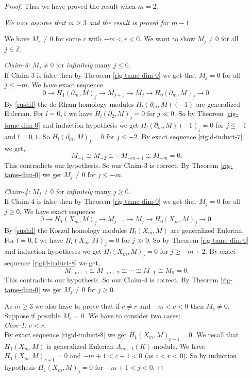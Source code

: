 \documentclass{amsart}
\newcommand{\ZZ}{\mathbb{Z} }
\newcommand{\rt}{\rightarrow}
\theoremstyle{plain}
\theoremstyle{definition}
\theoremstyle{remark}
\begin{document}
\begin{proof}
Thus we have proved the result when $m = 2$.

\textit{We now assume that $m \geq 3$ and the result is proved for $m-1$}.

We have $M_r \neq 0$ for some $r$ with $-m < r < 0$. We want to show $M_j \neq 0$ for all $j \in \ZZ$.

 \textit{Claim-3:} $M_j \neq 0$ for \textit{infinitely} many $j \leq 0$.\\
  If Claim-3 is false then by Theorem \ref{rig-tame-dim-0}  we get that $M_j  = 0$ for all $j \leq -m$.
  We have exact sequence
  \begin{equation}
  \label{rigid-induct-7}
  0 \rt H_1(\partial_m, M)_j \rt M_{j+1} \rt M_j \rt H_0(\partial_m, M)_j \rt 0.
 \end{equation}
 By \ref{sushil} the de Rham homology modules $H_l(\partial_m, M)(-1)$ are generalized Eulerian.
 For $l = 0, 1$ we have $H_l(\partial_2, M)_j = 0$  for $j \ll 0$. So by Theorem  \ref{rig-tame-dim-0} and induction hypothesis
 we get 
 $H_l(\partial_m, M)(-1)_j = 0$ for $j \leq -1$ and $l = 0, 1$. So $H_l(\partial_m, M)_j = 0$ for $j \leq -2$.
 By exact sequence \ref{rigid-induct-7} we get,
 \[
  M_{-1} \cong M_{-2} \cong \cdots M_{-m +1} \cong M_{-m} = 0.
 \]
This contradicts our hypothesis. So our Claim-3 is correct. By Theorem \ref{rig-tame-dim-0}  we get $M_j \neq 0$ for 
$j \leq  -m$.

\textit{Claim-4:} $M_j \neq 0$ for \textit{infinitely} many $j \geq 0$.\\
  If Claim-4 is false then by Theorem \ref{rig-tame-dim-0} we get that $M_j  = 0$ for all $j \geq 0$.
  We have exact sequence
  \begin{equation}
  \label{rigid-induct-8}
  0 \rt H_1(X_m, M)_j \rt M_{j-1} \rt M_j \rt H_0(X_m, M)_j \rt 0.
 \end{equation}
 By \ref{sushil} the Koszul homology modules $H_l(X_m, M)$ are generalized Eulerian.
 For $l = 0, 1$ we have $H_l(X_m, M)_j = 0$  for $j \gg 0$. So by Theorem  \ref{rig-tame-dim-0} and induction hypotheses
 we get
 $H_l(X_m, M)_j = 0$ for $j \geq -m + 2$. 
 By exact sequence \ref{rigid-induct-8} we get,
 \[
  M_{-m + 1} \cong M_{-m + 2} \cong \cdots \cong M_{-1} \cong M_0 = 0.
 \]
This contradicts our hypothesis. So our Claim-4 is correct.
By Theorem \ref{rig-tame-dim-0}  we get $M_j \neq 0$ for $j \geq 0$.

As $m \geq 3$ we also have to prove that if $c \neq r$ and $-m < c < 0$ then $M_c \neq 0$. \\
Suppose if possible $M_c = 0$. We have to consider two cases:\\
\textit{Case-1:} $c < r$. \\
By exact sequence \ref{rigid-induct-8} we get  $H_1(X_m, M)_{c+1} = 0$. 
 We recall that  \\ $H_1(X_m, M)$ is generalized Eulerian $A_{m-1}(K)$-module. 
 We have  \\ $H_1(X_m, M)_{c+1} = 0$ and $-m +1   < c + 1 < 0$ (as $c < r < 0$). 
  So by induction hypothesis $H_1(X_m, M)_{j} = 0$
 for $-m+1 < j < 0$.
 

\end{proof}
\end{document}
